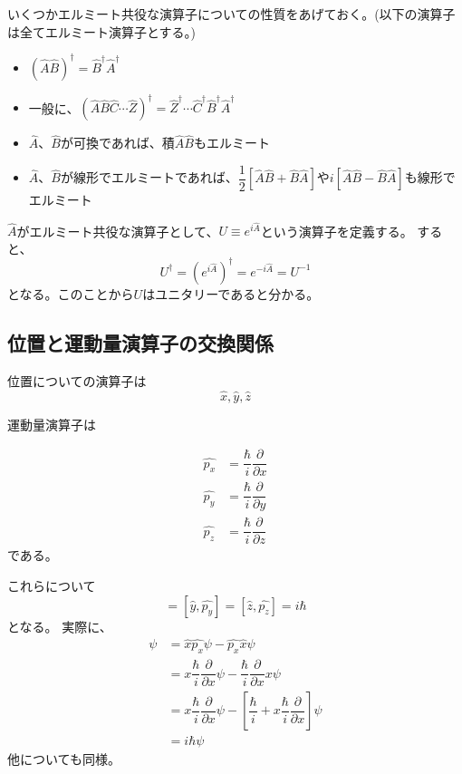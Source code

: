 いくつかエルミート共役な演算子についての性質をあげておく。(以下の演算子は全てエルミート演算子とする。)
\begin{itemize}
	\item $(\hat{A}\hat{B})^\dagger = \hat{B}^\dagger\hat{A}^\dagger$
	\item 一般に、$(\hat{A}\hat{B}\hat{C}\cdots\hat{Z})^\dagger = \hat{Z}^\dagger\cdots\hat{C}^\dagger\hat{B}^\dagger\hat{A}^\dagger$
	\item $\hat{A}$、$\hat{B}$が可換であれば、積$\hat{A}\hat{B}$もエルミート
	\item $\hat{A}$、$\hat{B}$が線形でエルミートであれば、$\dfrac{1}{2}[\hat{A}\hat{B} + \hat{B}\hat{A}]$や$i[\hat{A}\hat{B} - \hat{B}\hat{A}]$も線形でエルミート
\end{itemize}

$\hat{A}$がエルミート共役な演算子として、$U \equiv e^{i\hat{A}}$という演算子を定義する。
すると、
\begin{equation}
	U^\dagger = (e^{i\hat{A}})^\dagger = e^{-i\hat{A}} = U^{-1}
\end{equation}
となる。このことから$U$はユニタリーであると分かる。


\subsection{位置と運動量演算子の交換関係}
位置についての演算子は
\begin{equation}
	\hat{x}, \hat{y},\hat{z}
\end{equation}

運動量演算子は

\begin{align}
	\hat{p_x} &= \dfrac{\hbar}{i}\dfrac{\partial}{\partial x}\\
	\hat{p_y} &= \dfrac{\hbar}{i}\dfrac{\partial}{\partial y}\\
	\hat{p_z} &= \dfrac{\hbar}{i}\dfrac{\partial}{\partial z}
\end{align}
である。

これらについて
\begin{equation}
	[\hat{x},\hat{p_x}] = [\hat{y},\hat{p_y}] = [\hat{z},\hat{p_z}] = i\hbar
\end{equation}
となる。
実際に、
\begin{align}
	[\hat{x},\hat{p_x}]\psi
	&= \hat{x}\hat{p_x}\psi - \hat{p_x}\hat{x}\psi \\
	&= x\dfrac{\hbar}{i}\dfrac{\partial}{\partial x}\psi - \dfrac{\hbar}{i}\dfrac{\partial}{\partial x}x\psi \\
	&= x\dfrac{\hbar}{i}\dfrac{\partial}{\partial x}\psi - \left[ \dfrac{\hbar}{i} + x\dfrac{\hbar}{i}\dfrac{\partial}{\partial x} \right]\psi \\
	&= i\hbar\psi
\end{align}
他についても同様。

